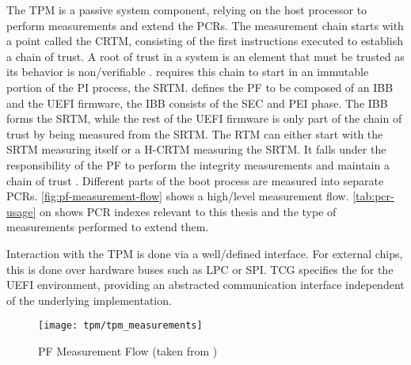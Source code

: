 The \ac{TPM} is a passive system component, relying on the host processor to perform measurements and extend the \acp{PCR}.
The measurement chain starts with a point called the \ac{CRTM}, consisting of the first instructions executed to establish a chain of trust.
A root of trust in a system is an element that must be trusted as its behavior is non\-/verifiable \cite[Section 9.4]{tcg-tpm-library-part1-architecture}.
\cite[Section 3.2.2]{tcg-pc-client-platform-firmware-profile-spec} requires this chain to start in an immutable portion of the \ac{PI} process, the \ac{SRTM}.
\cite[Section 3.2.3.1]{tcg-pc-client-platform-firmware-profile-spec} defines the \ac{PF} to be composed of an \ac{IBB} and the \ac{UEFI} firmware, the \ac{IBB} consists of the \ac{SEC} and \ac{PEI} phase.
The \ac{IBB} forms the \ac{SRTM}, while the rest of the \ac{UEFI} firmware is only part of the chain of trust by being measured from the \ac{SRTM}.
The \ac{RTM} can either start with the \ac{SRTM} measuring itself or a \ac{H-CRTM} measuring the \ac{SRTM}.
It falls under the responsibility of the \ac{PF} to perform the integrity measurements and maintain a chain of trust \cite{tcg-pc-client-platform-firmware-profile-spec}.
Different parts of the boot process are measured into separate \acp{PCR}.
\autoref{fig:pf-measurement-flow} shows a high\-/level measurement flow.
\autoref{tab:pcr-usage} on \pageref{tab:pcr-usage} shows \ac{PCR} indexes relevant to this thesis and the type of measurements performed to extend them.

Interaction with the \ac{TPM} is done via a well\-/defined interface.
For external chips, this is done over hardware buses such as \ac{LPC} or \ac{SPI}.
\ac{TCG} specifies the  for the \ac{UEFI} environment, providing an abstracted communication interface independent of the underlying implementation.

\begin{figure}[htb]
    \centering
    \texttt{[image: tpm/tpm\_measurements]}
    \caption[\acs{PF} Measurement Flow]{\acs{PF} Measurement Flow (taken from \cite[Figure 3]{tianocore-trusted-boot-chain})}
    \label{fig:pf-measurement-flow}
\end{figure}

